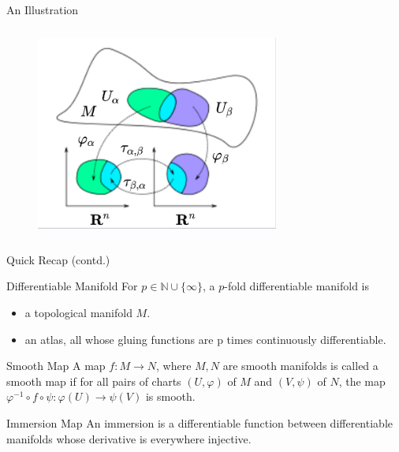 \documentclass{beamer}
\begin{document}
\begin{frame}{An Illustration}
\begin{figure}
    \centering
    \includegraphics[width=8cm, height=7cm]{gluing_function.png}
\end{figure}
    
\end{frame}

\begin{frame}{Quick Recap (contd.)}
    \begin{block}{Differentiable Manifold}
    For $p \in \mathbb{N} \cup \{\infty\}$, a $p$-fold differentiable manifold is 
    \begin{itemize}
        \item a topological manifold $M$.
        \item an atlas, all whose gluing functions are p times continuously differentiable.
    \end{itemize}
    \end{block}
    
    \begin{block}{Smooth Map}
    A map $f: M \to N$, where $M,N$ are smooth manifolds is called a smooth map if for all pairs of charts $(U,\varphi)$ of $M$ and $(V, \psi)$ of $N$, the map $\varphi^{-1}\circ f \circ \psi: \varphi(U) \to \psi(V)$ is smooth.
    \end{block}
    
    \begin{block}{Immersion Map}
    An immersion is a differentiable function between differentiable manifolds whose derivative is everywhere injective.
    \end{block}
 
\end{frame}
\end{document}
